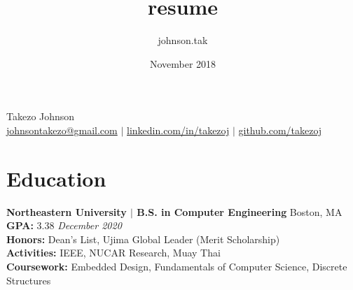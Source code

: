 \documentclass{article}
\title{resume}
\author{johnson.tak }
\date{November 2018}
\newcommand\HUGE{\fontsize{28}{48}\selectfont}
\begin{document}
\thispagestyle{empty}

\titleformat{\section}{\Large}{}{0em}{}{}
\titleformat{\subsection}{}{}{0em}{}{}

\renewcommand{\maketitle}{
\begin{center}
{\HUGE Takezo Johnson}\\
\vspace{.5em}
\href{mailto:johnsontakezo@gmail.com}{\faSend{ }johnsontakezo@gmail.com} $\mid$ 
\href{https://www.linkedin.com/in/takezoj}{\faLinkedinSquare{ }linkedin.com/in/takezoj} $\mid$ 
\href{https://www.github.com/takezoj}{\faGithub{ }github.com/takezoj}
\end{center}}

\newenvironment{myitemize}
{ \begin{itemize}
    \setlength{\itemsep}{0pt}
    \setlength{\parskip}{0pt}
    \setlength{\parsep}{0pt}     }
{ \end{itemize}                  } 

\maketitle

\section[Education \hfill]{Education \sout{\hfill}}
    {\bfseries\large Northeastern University $\mid$ B.S. in Computer Engineering} \hfill Boston, MA\\
    {\bfseries GPA:} 3.38 \hfill\textit{December 2020}\\
    {\bfseries Honors:} Dean's List, Ujima Global Leader (Merit Scholarship)\\
    {\bfseries Activities:} IEEE, NUCAR Research, Muay Thai\\
    {\bfseries Coursework:} Embedded Design, Fundamentals of Computer Science, Discrete Structures%
\end{document}
